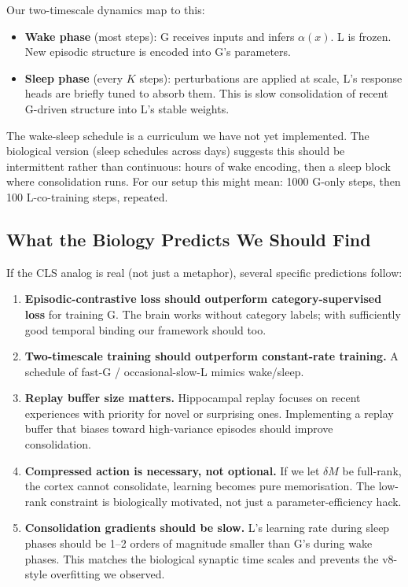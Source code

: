 \documentclass[11pt, a4paper]{article}
\theoremstyle{plain}
\theoremstyle{definition}
\theoremstyle{remark}
\begin{document}
Our two-timescale dynamics map to this:
\begin{itemize}[nosep]
\item \textbf{Wake phase} (most steps): G receives inputs and infers $\alpha(x)$. L is frozen. New episodic structure is encoded into G's parameters.
\item \textbf{Sleep phase} (every $K$ steps): perturbations are applied at scale, L's response heads are briefly tuned to absorb them. This is slow consolidation of recent G-driven structure into L's stable weights.
\end{itemize}

The wake-sleep schedule is a curriculum we have not yet implemented.
The biological version (sleep schedules across days) suggests this should be intermittent rather than continuous: hours of wake encoding, then a sleep block where consolidation runs.
For our setup this might mean: 1000 G-only steps, then 100 L-co-training steps, repeated.

\subsection{What the Biology Predicts We Should Find}

If the CLS analog is real (not just a metaphor), several specific predictions follow:

\begin{enumerate}[nosep]
\item \textbf{Episodic-contrastive loss should outperform category-supervised loss} for training G. The brain works without category labels; with sufficiently good temporal binding our framework should too.
\item \textbf{Two-timescale training should outperform constant-rate training.} A schedule of fast-G / occasional-slow-L mimics wake/sleep.
\item \textbf{Replay buffer size matters.} Hippocampal replay focuses on recent experiences with priority for novel or surprising ones. Implementing a replay buffer that biases toward high-variance episodes should improve consolidation.
\item \textbf{Compressed action is necessary, not optional.} If we let $\delta M$ be full-rank, the cortex cannot consolidate, learning becomes pure memorisation. The low-rank constraint is biologically motivated, not just a parameter-efficiency hack.
\item \textbf{Consolidation gradients should be slow.} L's learning rate during sleep phases should be 1--2 orders of magnitude smaller than G's during wake phases. This matches the biological synaptic time scales and prevents the v8-style overfitting we observed.
\end{enumerate}
\end{document}
